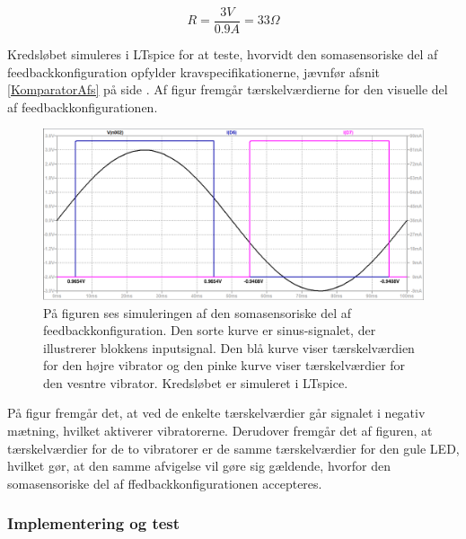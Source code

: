 \begin{equation} \label{vibrator_modstand}
R = \dfrac{3V}{0.9A} = 33\Omega
\end{equation}

Kredsløbet simuleres i LTspice for at teste, hvorvidt den somasensoriske del af feedbackkonfiguration opfylder kravspecifikationerne, jævnfør afsnit \ref{KomparatorAfs} på side \pageref{KomparatorAfs}. Af figur  fremgår tærskelværdierne for den visuelle del af feedbackkonfigurationen.

\begin{figure}[H]
	\centering
	\includegraphics[scale=0.3]{figures/cProblemloesning/vibration_graf.PNG}
	\caption{På figuren ses simuleringen af den somasensoriske del af feedbackkonfiguration. Den sorte kurve er sinus-signalet, der illustrerer blokkens inputsignal. Den blå kurve viser tærskelværdien for den højre vibrator og den pinke kurve viser tærskelværdier for den vesntre vibrator. Kredsløbet er simuleret i LTspice.}
	\label{fig:vibration_graf}
\end{figure}
På figur  fremgår det, at ved de enkelte tærskelværdier går signalet i negativ mætning, hvilket aktiverer vibratorerne. Derudover fremgår det af figuren, at tærskelværdier for de to vibratorer er de samme tærskelværdier for den gule LED, hvilket gør, at den samme afvigelse vil gøre sig gældende, hvorfor den somasensoriske del af ffedbackkonfigurationen accepteres. 

\subsubsection{Implementering og test}


